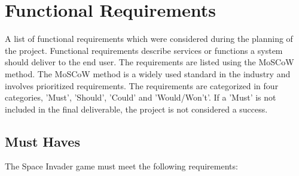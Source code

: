 \section{Functional Requirements}

A list of functional requirements which were considered during the planning of the project. Functional requirements describe services or functions a system should deliver to the end user. The requirements are listed using the MoSCoW method. The MoSCoW method is a widely used standard in the industry and involves prioritized requirements. The requirements are categorized in four categories, 'Must', 'Should', 'Could' and 'Would/Won't'. If a 'Must' is not included in the final deliverable, the project is not considered a success.

\subsection{Must Haves}
The Space Invader game must meet the following requirements:
